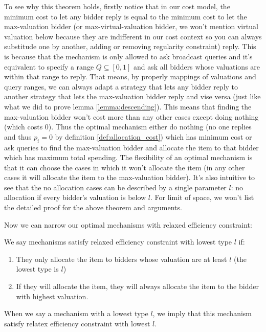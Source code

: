 To see why this theorem holds, firstly notice that in our cost model, the
minimum cost to let any bidder reply is equal to the minimum cost to let the
max-valuation bidder (or max-virtual-valuation bidder, we won't mention virtual
valuation below because they are indifferent in our cost context so you can
always substitude one by another, adding or removing regularity constraint)
reply.  This is because that the mechanism is only allowed to ask broadcast
queries and it's equivalent to specify a range $Q \subseteq [0, 1]$ and ask all
bidders whose valuations are within that range to reply. That means, by
properly mappings of valuations and query ranges, we can always adapt a
strategy that lets any bidder reply to another strategy that lets the
max-valuation bidder reply and vise versa (just like what we did to prove lemma
\ref{lemma:descending}). This means that finding the max-valuation bidder won't
cost more than any other cases except doing nothing (which costs $0$). Thus the
optimal mechanism either do nothing (no one replies and thus $p_i = 0$ by
definition \ref{def:allocation_cost}) which has minimum cost or ask queries to
find the max-valuation bidder and allocate the item to that bidder which has
maximum total spending.  The flexibility of an optimal mechanism is that it can
choose the cases in which it won't allocate the item (in any other cases it
will allocate the item to the max-valuation bidder). It's also intuitive
to see that the no allocation cases can be described by a single parameter $l$:
no allocation if every bidder's valuation is below $l$. For limit of space,
we won't list the detailed proof for the above theorem and arguments.

Now we can narrow our optimal mechanisms with relaxed efficiency constraint:

\begin{definition}

We say mechanisms satisfy relaxed efficiency constraint with lowest type $l$
if:

    \begin{enumerate}

    \item They only allocate the item to bidders whose valuation are at least
    $l$ (the lowest type is $l$)

    \item If they will allocate the item, they will always allocate the item to
    the bidder with highest valuation.

    \end{enumerate}

When we say a mechanism with a lowest type $l$, we imply that this mechanism
satisfy relatex efficiency constraint with lowest $l$.

\end{definition}

